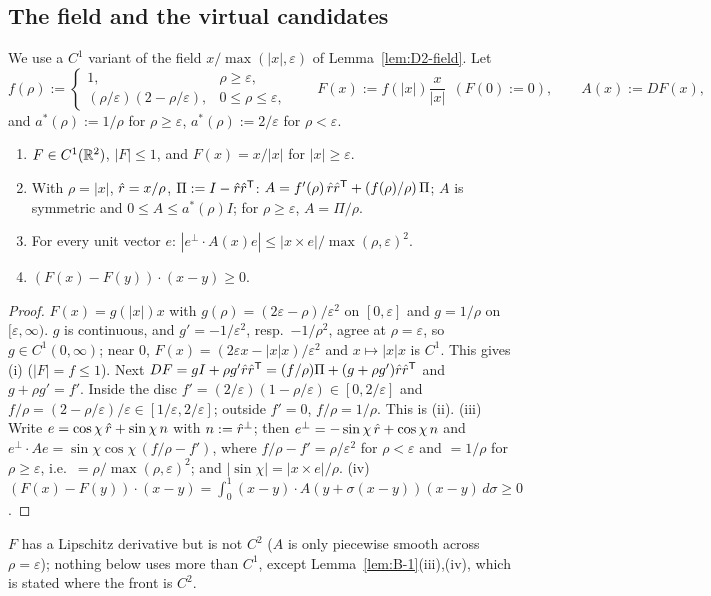 \subsection{The field and the virtual candidates}

We use a $C^1$ variant of the field $x/\max(|x|,\varepsilon)$ of Lemma~\ref{lem:D2-field}. Let
\[
f(\rho):=\begin{cases}1,&\rho\ge\varepsilon,\\ (\rho/\varepsilon)(2-\rho/\varepsilon),&0\le\rho\le\varepsilon,\end{cases}\qquad
F(x):=f(|x|)\frac{x}{|x|}\ \ (F(0):=0),\qquad A(x):=DF(x),
\]
and $a^*(\rho):=1/\rho$ for $\rho\ge\varepsilon$, $a^*(\rho):=2/\varepsilon$ for $\rho<\varepsilon$.

\begin{lemma}\label{lem:B-V}
\begin{enumerate}
\item[(i)] $F\in C^1(\mathbb{R}^2)$, $|F|\le1$, and $F(x)=x/|x|$ for $|x|\ge\varepsilon$.
\item[(ii)] With $\rho=|x|$, $\hat r=x/\rho$, $\Pi:=I-\hat r\hat r^{\mathsf T}$:
$A=f'(\rho)\,\hat r\hat r^{\mathsf T}+(f(\rho)/\rho)\,\Pi$; $A$ is symmetric and $0\le A\le a^*(\rho)I$; for $\rho\ge\varepsilon$,
$A=\Pi/\rho$.
\item[(iii)] For every unit vector $e$: $|e^\perp\cdot A(x)e|\le|x\times e|/\max(\rho,\varepsilon)^2$.
\item[(iv)] $(F(x)-F(y))\cdot(x-y)\ge0$.
\end{enumerate}
\end{lemma}
\begin{proof}
$F(x)=g(|x|)x$ with $g(\rho)=(2\varepsilon-\rho)/\varepsilon^2$ on $[0,\varepsilon]$ and $g=1/\rho$ on $[\varepsilon,\infty)$. $g$ is
continuous, and $g'=-1/\varepsilon^2$, resp.\ $-1/\rho^2$, agree at $\rho=\varepsilon$, so $g\in C^1(0,\infty)$; near $0$,
$F(x)=(2\varepsilon x-|x|x)/\varepsilon^2$ and $x\mapsto|x|x$ is $C^1$. This gives (i) ($|F|=f\le1$). Next
$DF=gI+\rho g'\hat r\hat r^{\mathsf T}=(f/\rho)\Pi+(g+\rho g')\hat r\hat r^{\mathsf T}$ and $g+\rho g'=f'$. Inside the disc
$f'=(2/\varepsilon)(1-\rho/\varepsilon)\in[0,2/\varepsilon]$ and $f/\rho=(2-\rho/\varepsilon)/\varepsilon\in[1/\varepsilon,2/\varepsilon]$;
outside $f'=0$, $f/\rho=1/\rho$. This is (ii). (iii) Write $e=\cos\chi\,\hat r+\sin\chi\,n$ with $n:=\hat r^\perp$; then
$e^\perp=-\sin\chi\,\hat r+\cos\chi\,n$ and $e^\perp\cdot Ae=\sin\chi\cos\chi\,(f/\rho-f')$, where $f/\rho-f'=\rho/\varepsilon^2$ for
$\rho<\varepsilon$ and $=1/\rho$ for $\rho\ge\varepsilon$, i.e.\ $=\rho/\max(\rho,\varepsilon)^2$; and $|\sin\chi|=|x\times e|/\rho$.
(iv) $(F(x)-F(y))\cdot(x-y)=\int_0^1(x-y)\cdot A(y+\sigma(x-y))(x-y)\,d\sigma\ge0$.
\end{proof}
$F$ has a Lipschitz derivative but is not $C^2$ ($A$ is only piecewise smooth across $\rho=\varepsilon$); nothing below uses more than
$C^1$, except Lemma~\ref{lem:B-1}(iii),(iv), which is stated where the front is $C^2$.

